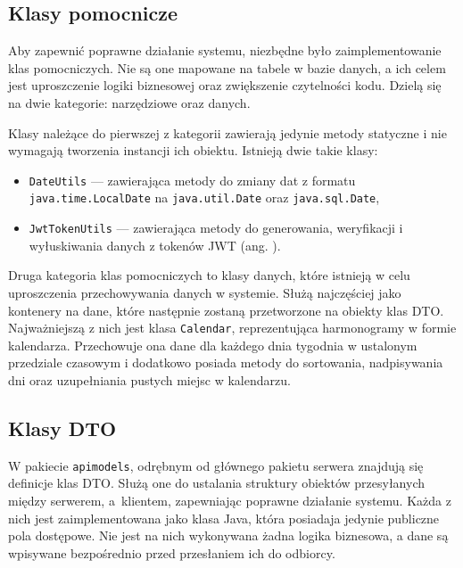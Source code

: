\subsection{Klasy pomocnicze}

Aby zapewnić poprawne działanie systemu, niezbędne było zaimplementowanie klas pomocniczych. Nie są one mapowane na tabele w bazie danych, a ich celem jest uproszczenie logiki biznesowej oraz zwiększenie czytelności kodu. Dzielą się na dwie kategorie: narzędziowe oraz danych.

Klasy należące do pierwszej z kategorii zawierają jedynie metody statyczne i nie wymagają tworzenia instancji ich obiektu. Istnieją dwie takie klasy:
\begin{itemize}
    \item \texttt{DateUtils} --- zawierająca metody do zmiany dat z formatu \texttt{java.time.LocalDate} na \texttt{java.util.Date} oraz \texttt{java.sql.Date},
    \item \texttt{JwtTokenUtils} --- zawierająca metody do generowania, weryfikacji i wyłuskiwania danych z tokenów JWT (ang. ).
\end{itemize}

Druga kategoria klas pomocniczych to klasy danych, które istnieją w celu uproszczenia przechowywania danych w systemie. Służą najczęściej jako kontenery na dane, które następnie zostaną przetworzone na obiekty klas DTO. Najważniejszą z nich jest klasa \texttt{Calendar}, reprezentująca harmonogramy w formie kalendarza. Przechowuje ona dane dla każdego dnia tygodnia w ustalonym przedziale czasowym i dodatkowo posiada metody do sortowania, nadpisywania dni oraz uzupełniania pustych miejsc w kalendarzu.

\subsection{Klasy DTO}

W pakiecie \texttt{apimodels}, odrębnym od głównego pakietu serwera znajdują się definicje klas DTO. Służą one do ustalania struktury obiektów przesyłanych między serwerem, a~klientem, zapewniając poprawne działanie systemu. Każda z nich jest zaimplementowana jako klasa Java, która posiadaja jedynie publiczne pola dostępowe. Nie jest na nich wykonywana żadna logika biznesowa, a dane są wpisywane bezpośrednio przed przesłaniem ich do odbiorcy.

